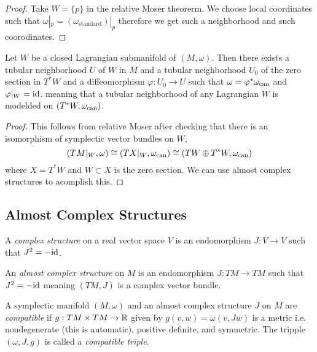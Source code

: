 \documentclass[12pt]{article}
\begin{document}
\begin{proof}
Take $W = \{ p \}$ in the relative Moser theorerm. We choose local coordinates such that $\omega|_p = (\omega_{\text{standard}})|_p$ therefore we get such a neighborhood and such coorodinates. 
\end{proof}

\begin{thm}[Weinstein]
Let $W$ be a closed Lagrangian submanifold of $(M, \omega)$. Then there exists a tubular neighborhood $U$ of $W$ in $M$ and a tubular neighborhood $U_0$ of the zero section in $T^* W$ and a diffeomorphism $\varphi : U_0 \to U$ such that $\omega = \varphi^* \omega_{\text{can}}$ and $\varphi|_W = \mathrm{id}$.  meaning that a tubular neighborhood of any Lagrangian $W$ is modelded on $(T^* W, \omega_{\text{can}})$. 
\end{thm}

\begin{proof}
This follows from relative Moser after checking that there is an isomorphism of symplectic vector bundles on $W$,
\[ (TM|_W, \omega) \cong (TX|_W, \omega_{\text{can}}) \cong (TW \oplus T^* W, \omega_{\text{can}}) \]
where $X = T^* W$ and $W \subset X$ is the zero section. We can use almost complex structures to acomplish this. 
\end{proof}

\subsection{Almost Complex Structures}

\begin{defn}
A \textit{complex structure} on a real vector space $V$ is an endomorphism $J : V \to V$ such that $J^2 = -\mathrm{id}$.
\end{defn}

\begin{defn}
An \textit{almost complex structure} on $M$ is an endomorphism $J : TM \to TM$ such that $J^2 = -\mathrm{id}$ meaning $(TM, J)$ is a complex vector bundle.
\end{defn}

\begin{defn}
A symplectic manifold $(M, \omega)$ and an almost complex structure $J$ on $M$ are \textit{compatible} if $g : TM \times TM \to \mathbb{R}$ given by $g(v,w) = \omega(v, J w)$ is a metric i.e. nondegenerate (this is automatic), positive definite, and symmetric. The tripple $(\omega, J, g)$ is called a \textit{compatible triple}. 
\end{defn}
\end{document}
